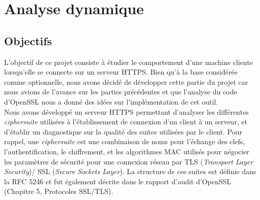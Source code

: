 \chapter{\label{analyseDynamique}Analyse dynamique}

\section{Objectifs}
L'objectif de ce projet consiste à étudier le comportement d'une machine cliente lorsqu'elle se connecte sur un serveur HTTPS. Bien qu'à la base considérée comme optionnelle, nous avons décidé de développer cette partie du projet car nous avions de l'avance sur les parties précédentes et que l'analyse du code d'OpenSSL nous a donné des idées sur l'implémentation de cet outil. \\

Nous avons développé un serveur HTTPS permettant d'analyser les différentes \textit{ciphersuite} utilisées à l'établissement de connexion d'un client à un serveur, et d'établir un diagnostique sur la qualité des suites utilisées par le client. Pour rappel, une \textit{ciphersuite} est une combinaison de noms pour l'échange des clefs, l'authentification, le chiffrement, et les algorithmes MAC utilisés pour négocier les paramètres de sécurité pour une connexion réseau par TLS (\textit{Transport Layer Security})/ SSL (\textit{Secure Sockets Layer}). La structure de ces suites est définie dans la RFC 5246 \cite{rfc5246} et fut également décrite dans le rapport d'audit d'OpenSSL (Chapitre 5, Protocoles SSL/TLS).\\




